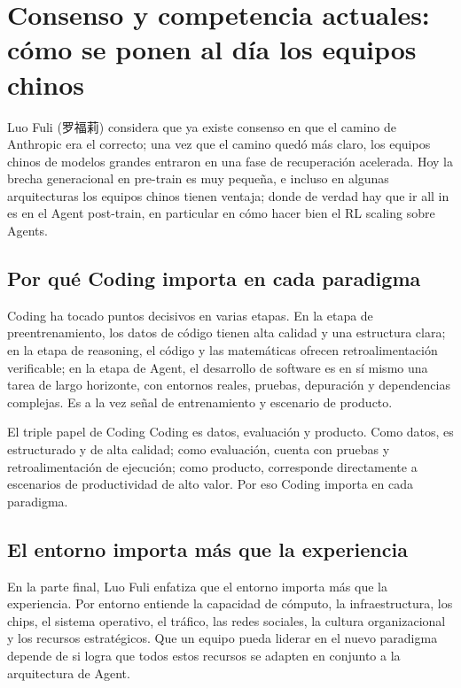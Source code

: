 \section{Consenso y competencia actuales: cómo se ponen al día los equipos chinos}

Luo Fuli (罗福莉) considera que ya existe consenso en que el camino de Anthropic era el correcto; una vez que el camino quedó más claro, los equipos chinos de modelos grandes entraron en una fase de recuperación acelerada. Hoy la brecha generacional en pre-train es muy pequeña, e incluso en algunas arquitecturas los equipos chinos tienen ventaja; donde de verdad hay que ir all in es en el Agent post-train, en particular en cómo hacer bien el RL scaling sobre Agents.

\subsection{Por qué Coding importa en cada paradigma}

Coding ha tocado puntos decisivos en varias etapas. En la etapa de preentrenamiento, los datos de código tienen alta calidad y una estructura clara; en la etapa de reasoning, el código y las matemáticas ofrecen retroalimentación verificable; en la etapa de Agent, el desarrollo de software es en sí mismo una tarea de largo horizonte, con entornos reales, pruebas, depuración y dependencias complejas. Es a la vez señal de entrenamiento y escenario de producto.

\begin{importantbox}{El triple papel de Coding}
Coding es datos, evaluación y producto. Como datos, es estructurado y de alta calidad; como evaluación, cuenta con pruebas y retroalimentación de ejecución; como producto, corresponde directamente a escenarios de productividad de alto valor. Por eso Coding importa en cada paradigma.
\end{importantbox}

\subsection{El entorno importa más que la experiencia}

En la parte final, Luo Fuli enfatiza que el entorno importa más que la experiencia. Por entorno entiende la capacidad de cómputo, la infraestructura, los chips, el sistema operativo, el tráfico, las redes sociales, la cultura organizacional y los recursos estratégicos. Que un equipo pueda liderar en el nuevo paradigma depende de si logra que todos estos recursos se adapten en conjunto a la arquitectura de Agent.

